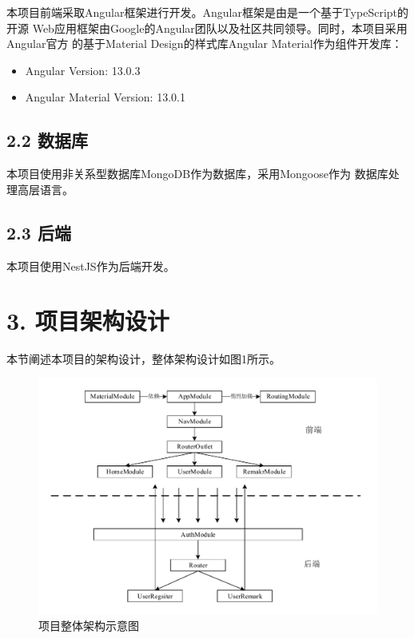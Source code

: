 \documentclass[a4paper,12pt, centering]{ctexart}
\begin{document}
  本项目前端采取Angular框架进行开发。Angular框架是由是一个基于TypeScript的开源
  Web应用框架由Google的Angular团队以及社区共同领导。同时，本项目采用Angular官方
  的基于Material Design的样式库Angular Material作为组件开发库：

  \begin{itemize}
    \item Angular Version: 13.0.3
    \item Angular Material Version: 13.0.1
  \end{itemize}

  \subsection*{2.2 数据库}

  本项目使用非关系型数据库MongoDB作为数据库，采用Mongoose作为
  数据库处理高层语言。

  \subsection*{2.3 后端}

  本项目使用NestJS作为后端开发。

  \section*{3. 项目架构设计}

  本节阐述本项目的架构设计，整体架构设计如图1所示。

  \begin{figure}[h]
    \centering
    \includegraphics[width=\textwidth]{1.pdf}
    \caption{项目整体架构示意图}
  \end{figure}
\end{document}
